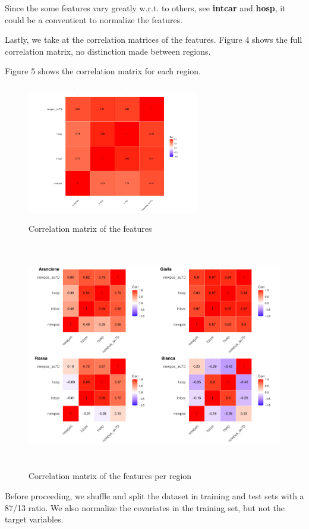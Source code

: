 \documentclass[12pt,a4paper]{article}
\theoremstyle{definition}
\theoremstyle{remark}
\begin{document}
    Since the some features vary greatly w.r.t. to others, see \textbf{intcar} and \textbf{hosp}, it could be a conventient to normalize the features. 

Lastly, we take at the correlation matrices of the features. Figure 4 shows the full correlation matrix, no distinction made between regions. 

Figure 5 shows the correlation matrix for each region.
    
\begin{figure}[htb!]
	\centering
	\includegraphics[width=75mm, height=60mm,scale=0.5]{corrmatrix.pdf}
	\caption{Correlation matrix of the features}
\end{figure}
\begin{figure}[htb!]
	\centering
	\includegraphics[width=130mm, height=100mm,scale=0.5]{corrmat2.pdf}
	\caption{Correlation matrix of the features per region}
\end{figure}


Before proceeding, we shuffle and split the dataset in training and test sets with a 87/13 ratio. We also normalize the covariates in the training set, but not the target variables.
\end{document}
